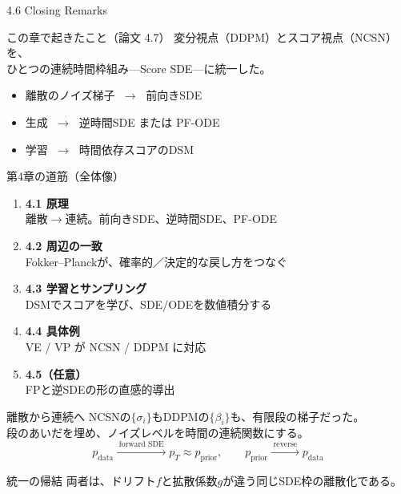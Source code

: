 

\begin{frame}{4.6 Closing Remarks}
    \begin{block}{この章で起きたこと（論文 4.7）}
        変分視点（DDPM）とスコア視点（NCSN）を、\\
        ひとつの連続時間枠組み---Score SDE---に統一した。
    \end{block}
    \begin{itemize}
        \item 離散のノイズ梯子 $\;\to\;$ 前向きSDE
        \item 生成 $\;\to\;$ 逆時間SDE または PF-ODE
        \item 学習 $\;\to\;$ 時間依存スコアのDSM
    \end{itemize}
\end{frame}
\asmain
\begin{frame}{第4章の道筋（全体像）}
    \begin{enumerate}
        \item \textbf{4.1 原理}\\
        離散$\to$連続。前向きSDE、逆時間SDE、PF-ODE
        \item \textbf{4.2 周辺の一致}\\
        Fokker--Planckが、確率的／決定的な戻し方をつなぐ
        \item \textbf{4.3 学習とサンプリング}\\
        DSMでスコアを学び、SDE/ODEを数値積分する
        \item \textbf{4.4 具体例}\\
        VE / VP が NCSN / DDPM に対応
        \item \textbf{4.5（任意）}\\
        FPと逆SDEの形の直感的導出
    \end{enumerate}
\end{frame}
\asmain
\begin{frame}{離散から連続へ}
    NCSNの$\{\sigma_i\}$もDDPMの$\{\beta_i\}$も、有限段の梯子だった。\\
    段のあいだを埋め、ノイズレベルを時間の連続関数にする。
    \[
        p_{\mathrm{data}}
        \xrightarrow{\;\text{forward SDE}\;}
        p_T\approx p_{\mathrm{prior}},
        \qquad
        p_{\mathrm{prior}}
        \xrightarrow{\;\text{reverse}\;}
        p_{\mathrm{data}}
    \]
    \begin{block}{統一の帰結}
        両者は、ドリフト$f$と拡散係数$g$が違う同じSDE枠の離散化である。
    \end{block}
\end{frame}
